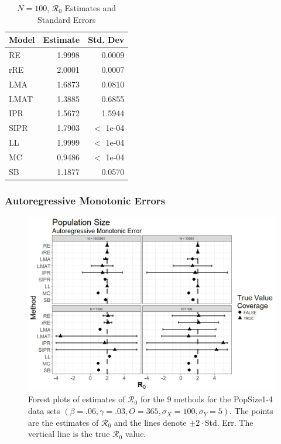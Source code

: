 \documentclass[12pt]{article}
\newcommand{\xxsir}{\ensuremath{9} } %
\newcommand{\rr}{\ensuremath{\mathcal{R}_0}}
\begin{document}
\begin{table}[H]
	
	\centering
	\begin{tabular}[t]{l|r|r}
		\hline
		Model & Estimate & Std. Dev\\
		\hline
		RE & 1.9998 & 0.0009\\
		\hline
		rRE & 2.0001 & 0.0007\\
		\hline
		LMA & 1.6873 & 0.0810\\
		\hline
		LMAT & 1.3885 & 0.6855\\
		\hline
		IPR & 1.5672 & 1.5944\\
		\hline
		SIPR & 1.7903 & $<$ 1e-04\\
		\hline
		LL & 1.9999 & $<$ 1e-04\\
		\hline
		MC & 0.9486 & $<$ 1e-04\\
		\hline
		SB & 1.1877 & 0.0570\\
		\hline
	\end{tabular}
	\caption{$N = 100$, $\rr$ Estimates and Standard Errors}
\end{table}

\subsubsection{Autoregressive Monotonic Errors}

\begin{figure}[H]
	\centering
	\includegraphics[scale=0.5]{images/popsize_arm.jpeg}
	\caption{Forest plots of estimates of $\rr$ for the \xxsir methods for the PopSize1-4 data sets $(\beta=.06, \gamma=.03, O=365, \sigma_X=100, \sigma_Y=5)$.  The points are the estimates of $\rr$ and the lines denote $\pm 2\cdot $Std. Err.  The vertical line is the true $\rr$ value.}
\end{figure}
\end{document}
